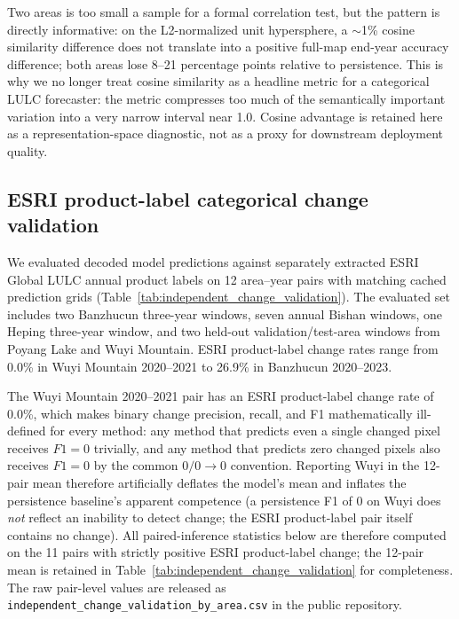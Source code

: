 \documentclass{article}
\begin{document}
Two areas is too small a sample for a formal correlation test, but the pattern is directly informative: on the L2-normalized unit hypersphere, a $\sim$1\% cosine similarity difference does not translate into a positive full-map end-year accuracy difference; both areas lose 8--21 percentage points relative to persistence. This is why we no longer treat cosine similarity as a headline metric for a categorical LULC forecaster: the metric compresses too much of the semantically important variation into a very narrow interval near 1.0. Cosine advantage is retained here as a representation-space diagnostic, not as a proxy for downstream deployment quality.

\subsection{ESRI product-label categorical change validation}
\label{sec:independent_change_validation}

We evaluated decoded model predictions against separately extracted ESRI Global LULC annual product labels on 12 area--year pairs with matching cached prediction grids (Table~\ref{tab:independent_change_validation}). The evaluated set includes two Banzhucun three-year windows, seven annual Bishan windows, one Heping three-year window, and two held-out validation/test-area windows from Poyang Lake and Wuyi Mountain. ESRI product-label change rates range from 0.0\% in Wuyi Mountain 2020--2021 to 26.9\% in Banzhucun 2020--2023.

The Wuyi Mountain 2020--2021 pair has an ESRI product-label change rate of 0.0\%, which makes binary change precision, recall, and F1 mathematically ill-defined for every method: any method that predicts even a single changed pixel receives $F1=0$ trivially, and any method that predicts zero changed pixels also receives $F1=0$ by the common $0/0 \to 0$ convention. Reporting Wuyi in the 12-pair mean therefore artificially deflates the model's mean and inflates the persistence baseline's apparent competence (a persistence F1 of $0$ on Wuyi does \emph{not} reflect an inability to detect change; the ESRI product-label pair itself contains no change). All paired-inference statistics below are therefore computed on the 11 pairs with strictly positive ESRI product-label change; the 12-pair mean is retained in Table~\ref{tab:independent_change_validation} for completeness. The raw pair-level values are released as \texttt{independent\_change\_validation\_by\_area.csv} in the public repository.
\end{document}
